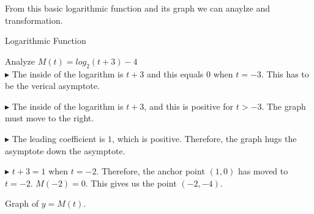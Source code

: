 \documentclass{ximera}
\begin{document}
From this basic logarithmic function and its graph we can anaylze and transformation.
















\begin{example}  Logarithmic Function



Analyze   $M(t) = log_2(t+3) - 4$ \\


$\blacktriangleright$ The inside of the logarithm is $t+3$ and this equals $0$ when $t=-3$.  This has to be the verical asymptote.

$\blacktriangleright$ The inside of the logarithm is $t+3$, and this is positive for $t>-3$.  The graph must move to the right.

$\blacktriangleright$ The leading coefficient is $1$, which is positive.  Therefore, the graph hugs the asymptote down the asymptote. 

$\blacktriangleright$ $t+3=1$ when $t=-2$. Therefore, the anchor point $(1,0)$ has moved to $t = -2$.  $M(-2) = 0$.  This gives us the point $(-2, -4)$.





Graph of $y = M(t)$.

\begin{image}
\end{image}
\end{example}
\end{document}
